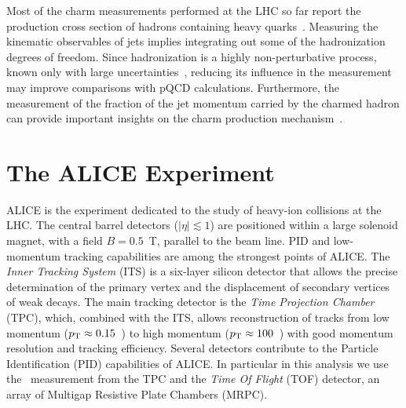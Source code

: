 \documentclass[a4paper]{jpconf}
\begin{document}
Most of the charm measurements performed at the LHC so far report the production cross section of hadrons
containing heavy quarks~\cite{ALICE:2012d, LHCb:2013a, ATLAS:2016a, ALICE:2016b}.
Measuring the kinematic observables of jets implies integrating out some of the hadronization degrees of freedom. 
Since hadronization is a highly non-perturbative process, known only with large uncertainties~\cite{dEnterria:2014}, 
reducing its influence in the measurement may improve comparisons with pQCD calculations.
Furthermore, 
the measurement of the fraction of the jet momentum carried 
by the charmed hadron can provide important insights on the charm production mechanism~\cite{CDF:1990, UA1:1990, STAR:2009a, ATLAS:2012d}.

\section{The ALICE Experiment}
ALICE is the experiment dedicated to the study of heavy-ion collisions at the LHC.
The central barrel detectors ($\lvert \eta\rvert \lesssim 1$) are positioned within a large solenoid magnet, with a
field $B = 0.5$~T, parallel to the beam line.
PID and low-momentum tracking capabilities are among the strongest points of ALICE.
The \emph{Inner Tracking System} (ITS) is a six-layer silicon detector that allows the precise determination of the primary vertex 
and the displacement of secondary vertices of weak decays.
The main tracking detector is the \emph{Time Projection Chamber} (TPC), which, combined with the ITS, allows reconstruction of tracks 
from low momentum ($p_{\rm T}\approx0.15$~\GeVc) to high momentum
($p_{\rm T}\approx100$~\GeVc) with good momentum resolution and tracking efficiency.
Several detectors contribute to the Particle Identification (PID) capabilities of ALICE. 
In particular in this analysis we use the \dedx\ measurement from the TPC and
the \emph{Time Of Flight} (TOF) detector,
an array of Multigap Resistive Plate Chambers (MRPC).
\end{document}
